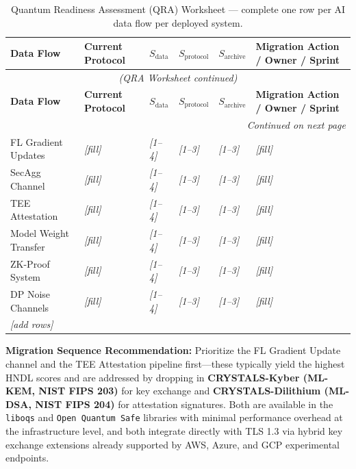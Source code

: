 \begin{longtable}{p{2.5cm} p{1.8cm} p{1.5cm} p{1.5cm} p{1.5cm} p{3.5cm}}
\caption{Quantum Readiness Assessment (QRA) Worksheet --- complete one row per AI data flow per deployed system.}
\label{tab:qra_worksheet} \\
\toprule
\textbf{Data Flow} & \textbf{Current Protocol} & $S_{\text{data}}$ & $S_{\text{protocol}}$ & $S_{\text{archive}}$ & \textbf{Migration Action / Owner / Sprint} \\
\midrule
\endfirsthead
\multicolumn{6}{c}{\textit{(QRA Worksheet continued)}} \\
\toprule
\textbf{Data Flow} & \textbf{Current Protocol} & $S_{\text{data}}$ & $S_{\text{protocol}}$ & $S_{\text{archive}}$ & \textbf{Migration Action / Owner / Sprint} \\
\midrule
\endhead
\midrule \multicolumn{6}{r}{\textit{Continued on next page}} \\
\endfoot
\bottomrule
\endlastfoot
FL Gradient Updates & \textit{[fill]} & \textit{[1--4]} & \textit{[1--3]} & \textit{[1--3]} & \textit{[fill]} \\[4pt]
SecAgg Channel & \textit{[fill]} & \textit{[1--4]} & \textit{[1--3]} & \textit{[1--3]} & \textit{[fill]} \\[4pt]
TEE Attestation & \textit{[fill]} & \textit{[1--4]} & \textit{[1--3]} & \textit{[1--3]} & \textit{[fill]} \\[4pt]
Model Weight Transfer & \textit{[fill]} & \textit{[1--4]} & \textit{[1--3]} & \textit{[1--3]} & \textit{[fill]} \\[4pt]
ZK-Proof System & \textit{[fill]} & \textit{[1--4]} & \textit{[1--3]} & \textit{[1--3]} & \textit{[fill]} \\[4pt]
DP Noise Channels & \textit{[fill]} & \textit{[1--4]} & \textit{[1--3]} & \textit{[1--3]} & \textit{[fill]} \\[4pt]
\textit{[add rows]} & & & & & \\
\end{longtable}

\begin{svgraybox}
\textbf{Migration Sequence Recommendation:} Prioritize the FL Gradient Update channel and the TEE Attestation pipeline first---these typically yield the highest HNDL scores and are addressed by dropping in \textbf{CRYSTALS-Kyber (ML-KEM, NIST FIPS 203)} for key exchange and \textbf{CRYSTALS-Dilithium (ML-DSA, NIST FIPS 204)} for attestation signatures. Both are available in the \texttt{liboqs} and \texttt{Open Quantum Safe} libraries with minimal performance overhead at the infrastructure level, and both integrate directly with TLS 1.3 via hybrid key exchange extensions already supported by AWS, Azure, and GCP experimental endpoints.
\end{svgraybox}

